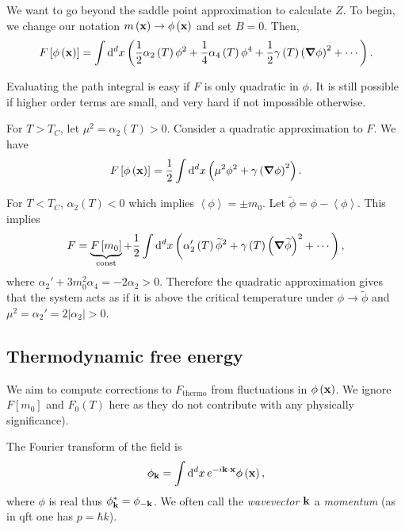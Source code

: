 
We want to go beyond the saddle point approximation to calculate $Z$. To begin, we change our notation $m \left( \vb{x} \right) \to \phi \left( \vb{x} \right) $ and set $B = 0$. Then,
\begin{align}
    F \left[ \phi \left( \vb{x} \right)  \right] = \int \dd{^{d}x} \left( \frac{1}{2} \alpha_2 \left( T \right) \phi^2 + \frac{1}{4}\alpha_4 \left( T \right) \phi^{4} + \frac{1}{2} \gamma \left( T \right) \left( \grad \phi \right)^2 + \cdots \right) 
.\end{align}

Evaluating the path integral is easy if $F$ is only quadratic in $\phi$. It is still possible if higher order terms are small, and very hard if not impossible otherwise.

For $T > T_C$, let $\mu^2 = \alpha_2 \left( T \right) > 0$. Consider a quadratic approximation to $F$. We have
\begin{align}
    F \left[ \phi \left( \vb{x} \right)  \right] = \frac{1}{2} \int \dd{^{d}x} \left( \mu^2 \phi^2 + \gamma \left( \grad \phi \right)^2 \right) 
.\end{align}

For $T < T_C$, $\alpha_2 \left( T \right)  < 0$ which implies $\left<\phi \right> = \pm m_0$. Let $\widetilde{\phi} = \phi - \left<\phi \right>$. This implies
\begin{align}
    F =  \underbrace{F\left[ m_0 \right]}_{\text{const}}  + \frac{1}{2} \int \dd{^{d}x} \left( \alpha_2' \left( T \right) \widetilde{\phi}^2 + \gamma \left( T \right) \left( \grad \widetilde{\phi} \right)^2 + \cdots \right) 
,\end{align}
where $\alpha_2' + 3m_0^2 \alpha_4 = - 2 \alpha_2 > 0$. Therefore the quadratic approximation gives that the system acts as if it is above the critical temperature under $\phi \to \widetilde{\phi}$ and $\mu^2 = \alpha_2' = 2 \left| \alpha_2 \right| > 0$.


\subsection{Thermodynamic free energy}

We aim to compute corrections to $F_\text{thermo}$ from fluctuations in $\phi \left( \vb{x} \right) $. We ignore $F \left[ m_0 \right] $ and $F_0 \left( T \right) $ here as they do not contribute with any physically significance).

The Fourier transform of the field is
\begin{align}
    \phi_{\vb{k}} = \int \dd{^{d}x} e^{-i \vb{k} \cdot \vb{x}} \phi \left( \vb{x} \right) 
,\end{align}
where $\phi$ is real thus $\phi_{\vb{k}}^{*} = \phi_{-\vb{k}}$. We often call the \textit{wavevector} $\vb{k}$ a \textit{momentum} (as in qft one has $p = \hbar k$).

